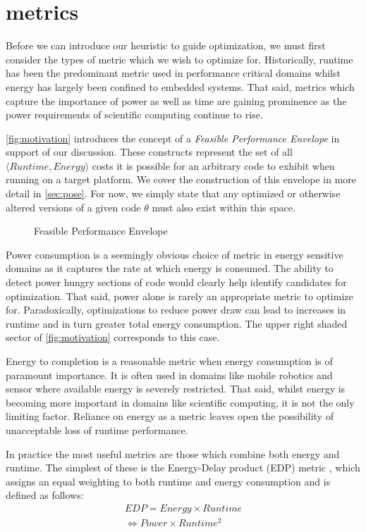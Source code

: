 \section{metrics}
\label{sec:metrics}


Before we can introduce our heuristic to guide optimization, we must first consider the types of metric which we wish to optimize for. 
Historically, runtime has been the predominant metric used in performance critical domains whilst energy has largely been confined to embedded systems.
That said, metrics which capture the importance of power as well as time are gaining prominence as the power requirements of scientific computing continue to rise.

\autoref{fig:motivation} introduces the concept of a \emph{Feasible Performance Envelope} in support of our discussion.
These constructs represent the set of all $\langle Runtime, Energy\rangle$ costs it is possible for an arbitrary code to exhibit when running on a target platform.
We cover the construction of this envelope in more detail in \autoref{sec:pose}.
For now, we simply state that any optimized or otherwise altered versions of a given code $\theta$ must also exist within this space.

\begin{figure}
\centering

\caption{Feasible Performance Envelope}
\label{fig:motivation}
\end{figure}

Power consumption is a seemingly obvious choice of metric in energy sensitive domains as it captures the rate at which energy is consumed.
The ability to detect power hungry sections of code would clearly help identify candidates for optimization.
That said, power alone is rarely an appropriate metric to optimize for.
Paradoxically, optimizations to reduce power draw can lead to increases in runtime and in turn greater total energy consumption.
The upper right shaded sector of \autoref{fig:motivation} corresponds to this case.

Energy to completion is a reasonable metric when energy consumption is of paramount importance.
It is often used in domains like mobile robotics and sensor where available energy is severely restricted.
That said, whilst energy is becoming more important in domains like scientific computing, it is not the only limiting factor. 
Reliance on energy as a metric leaves open the possibility of unacceptable loss of runtime performance.

In practice the most useful metrics are those which combine both energy and runtime.
The simplest of these is the Energy-Delay product (EDP) metric \cite{gonzales:1995aa}, which assigns an equal weighting to both runtime and energy consumption and is defined as follows:
\begin{align}
  EDP = Energy \times Runtime \nonumber \\
      \Leftrightarrow Power \times Runtime^{2} 
  \label{eq:edp}
\end{align}

